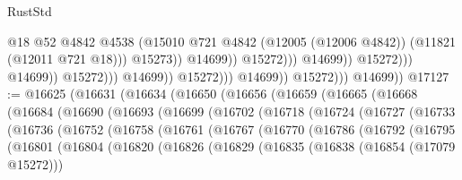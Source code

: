 \begin{lexlean}{RustStd}
\begin{coremodule}
                                                              @18
                                                              @52
                                                              @4842
                                                              @4538
                                                              (@15010
                                                                @721
                                                                @4842
                                                                (@12005 (@12006 @4842))
                                                                (@11821 (@12011 @721 @18)))
                                                              @15273))
                                                          @14699))
                                                      @15272)))
                                                @14699))
                                            @15272)))
                                      @14699))
                                  @15272)))
                            @14699))
                        @15272)))
                  @14699))
              @15272)))
        @14699))
@17127 := @16625
    (@16631
      (@16634
        (@16650
          (@16656
            (@16659
              (@16665
                (@16668
                  (@16684
                    (@16690
                      (@16693
                        (@16699
                          (@16702
                            (@16718
                              (@16724
                                (@16727
                                  (@16733
                                    (@16736
                                      (@16752
                                        (@16758
                                          (@16761
                                            (@16767
                                              (@16770
                                                (@16786
                                                  (@16792
                                                    (@16795
                                                      (@16801
                                                        (@16804
                                                          (@16820
                                                            (@16826
                                                              (@16829
                                                                (@16835
                                                                  (@16838 (@16854 (@17079 @15272)))

\end{coremodule}
\end{lexlean}
